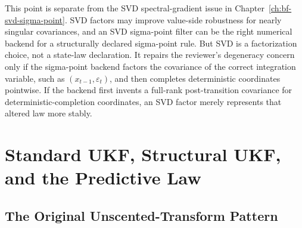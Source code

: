 This point is separate from the SVD spectral-gradient issue in
Chapter~\ref{ch:bf-svd-sigma-point}.  SVD factors may improve value-side
robustness for nearly singular covariances, and an SVD sigma-point filter can
be the right numerical backend for a structurally declared sigma-point rule.
But SVD is a factorization choice, not a state-law declaration.  It repairs the
reviewer's degeneracy concern only if the sigma-point backend factors the
covariance of the correct integration variable, such as
$(x_{t-1},\varepsilon_t)$, and then completes deterministic coordinates
pointwise.  If the backend first invents a full-rank post-transition covariance
for deterministic-completion coordinates, an SVD factor merely represents that
altered law more stably.

\section{Standard UKF, Structural UKF, and the Predictive Law}
\label{sec:bf-ukf-structural-overview}

\subsection{The Original Unscented-Transform Pattern}
\label{sec:bf-original-ut-pattern}

